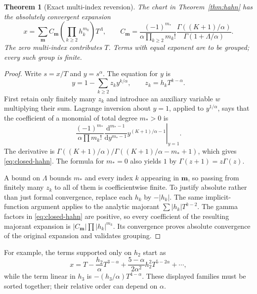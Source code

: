 \documentclass[11pt,a4paper]{article}
\numberwithin{equation}{section}
\newtheorem{theorem}{Theorem}[section]
\theoremstyle{definition}
\theoremstyle{remark}
\newcommand{\m}{\boldsymbol m}
\begin{document}
\begin{theorem}[Exact multi-index reversion]
\label{thm:hahn-coeff}
The chart in Theorem~\ref{thm:hahn} has the absolutely convergent expansion
\begin{equation}\label{eq:closed-hahn}
 x=\sum_{\m}C_{\m}\left(\prod_{k\ge2}h_k^{m_k}\right)T^\Lambda,
 \qquad
 C_{\m}=\frac{(-1)^{m_*}}{\alpha\prod_{k\ge2}m_k!}
       \frac{\Gamma((K+1)/\alpha)}{\Gamma(1+\Lambda/\alpha)}.
\end{equation}
The zero multi-index contributes $T$. Terms with equal exponent are to
be grouped; every such group is finite.
\end{theorem}
\begin{proof}
Write $s=x/T$ and $y=s^\alpha$. The equation for $y$ is
\[
 y=1-\sum_{k\ge2}z_k y^{k/\alpha},\qquad z_k=h_kT^{k-\alpha}.
\]
First retain only finitely many $z_k$ and introduce an auxiliary variable
$w$ multiplying their sum. Lagrange inversion about $y=1$, applied to
$y^{1/\alpha}$, says that the coefficient of a monomial of total degree
$m_*>0$ is
\[
 \frac{(-1)^{m_*}}{\alpha\prod m_k!}
 \left.\frac{\mathrm d^{m_*-1}}{\mathrm dy^{m_*-1}}
                 y^{(K+1)/\alpha-1}\right|_{y=1}.
\]
The derivative is
$\Gamma((K+1)/\alpha)/\Gamma((K+1)/\alpha-m_*+1)$,
which gives \eqref{eq:closed-hahn}. The formula for $m_*=0$ also yields
$1$ by $\Gamma(z+1)=z\Gamma(z)$.

A bound on $\Lambda$ bounds $m_*$ and every index $k$ appearing in $\m$,
so passing from finitely many $z_k$ to all of them is coefficientwise
finite. To justify absolute rather than just formal convergence, replace
each $h_k$ by $-|h_k|$. The same implicit-function argument applies to
the analytic majorant $\sum |h_k|T^{k-2}$. The gamma factors in
\eqref{eq:closed-hahn} are positive, so every coefficient of the resulting
majorant expansion is $|C_{\m}|\prod|h_k|^{m_k}$. Its convergence proves
absolute convergence of the original expansion and validates grouping.
\end{proof}

For example, the terms supported only on $h_2$ start as
\begin{equation}\label{eq:first-hahn}
 x=T-\frac{h_2}{\alpha}T^{3-\alpha}
       +\frac{5-\alpha}{2\alpha^2}h_2^2T^{5-2\alpha}+\cdots,
\end{equation}
while the term linear in $h_3$ is $-(h_3/\alpha)T^{4-\alpha}$.
These displayed families must be sorted together; their relative order
can depend on $\alpha$.
\end{document}
